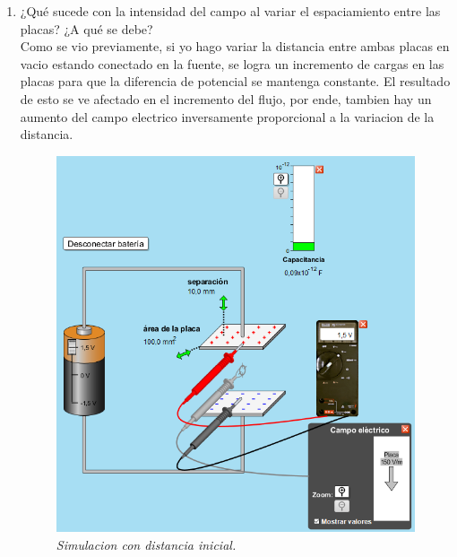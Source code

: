 \documentclass[12pt]{report}
\begin{document}
\begin{enumerate}
\newpage

    \item ¿Qué sucede con la intensidad del campo al variar el espaciamiento entre las placas? ¿A qué se debe?\\[6pt]
    Como se vio previamente, si yo hago variar la distancia entre ambas placas en vacio estando conectado en la fuente, se logra un incremento de cargas en las placas para que la diferencia de potencial se mantenga constante. El resultado de esto se ve afectado en el incremento del flujo, por ende, tambien hay un aumento del campo electrico inversamente proporcional a la variacion de la distancia.

    \begin{figure}[h]
        \centering
        \begin{minipage}[h]{0.4\textwidth}
        \centering
        \includegraphics[width=1\textwidth]{./images/2FOTO3.png}
        \textit{Simulacion con distancia inicial.} 
        \end{minipage}\hskip 1cm
        \begin{minipage}[h]{0.4\textwidth}
        \centering

\end{minipage}
\end{figure}
\end{enumerate}
\end{document}
